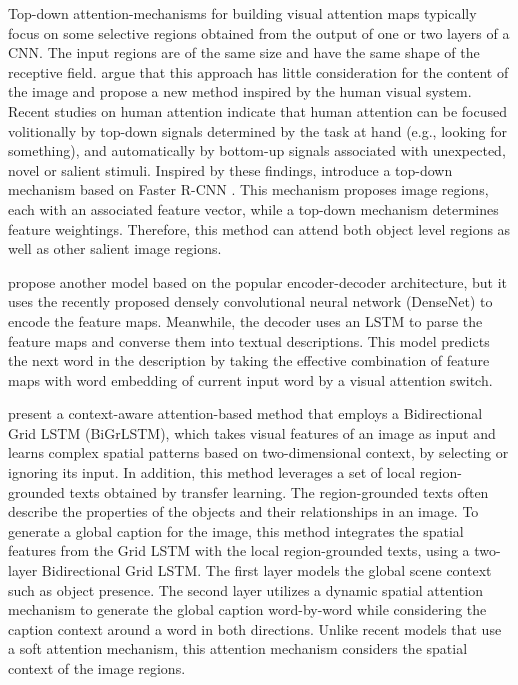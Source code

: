 Top-down attention-mechanisms for building visual attention maps typically focus on some selective regions obtained from the output of one or two layers of a CNN. The input regions are of the same size and have the same shape of the receptive field. \citet{Anderson2018_BUTD} argue that this approach has little consideration for the content of the image and propose a new method inspired by the human visual system. Recent studies on human attention \citep{Buschman2007} indicate that human attention can be focused volitionally by top-down signals determined by the task at hand (e.g., looking for something), and automatically by bottom-up signals associated with unexpected, novel or salient stimuli. Inspired by these findings, \citeauthor{Anderson2018_BUTD} introduce a top-down mechanism based on Faster R-CNN \citet{Ren2015}. This mechanism proposes image regions, each with an associated feature vector, while a top-down mechanism determines feature weightings. Therefore, this method can attend both object level regions as well as other salient image regions. 

\citet{Hao2018} propose another model based on the popular encoder-decoder architecture, but it uses the recently proposed densely convolutional neural network (DenseNet) to encode the feature maps. Meanwhile, the decoder uses an LSTM to parse the feature maps and converse them into textual descriptions. This model predicts the next word in the description by taking the effective combination of feature maps with word embedding of current input word by a visual attention switch.

\citet{Khademi2018} present a context-aware attention-based method that employs a Bidirectional Grid LSTM (BiGrLSTM), which takes visual features of an image as input and learns complex spatial patterns based on two-dimensional context, by selecting or ignoring its input. In addition, this method leverages a set of local region-grounded texts obtained by transfer learning. The region-grounded texts often describe the properties of the objects and their relationships in an image. To generate a global caption for the image, this method integrates the spatial features from the Grid LSTM with the local region-grounded texts, using a two-layer Bidirectional Grid LSTM. The first layer models the global scene context such as object presence. The second layer utilizes a dynamic spatial attention mechanism to generate the global caption word-by-word while considering the caption context around a word in both directions. Unlike recent models that use a soft attention mechanism, this attention mechanism considers the spatial context of the image regions.

